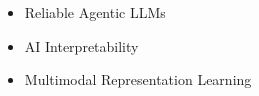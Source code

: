 \twocolumnsection
{
\begin{skills}
\end{skills}}
{
\vspace{1em}
\begin{itemize}
    \item Reliable Agentic LLMs
	\item AI Interpretability
    \item Multimodal Representation Learning
\end{itemize}
}
